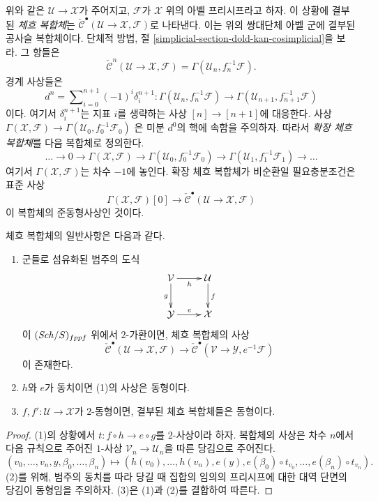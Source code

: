 \medskip\noindent
위와 같은 $\mathcal{U} \to \mathcal{X}$가 주어지고,
$\mathcal{F}$가 $\mathcal{X}$ 위의 아벨 프리시프라고 하자.
이 상황에 결부된 {\it 체흐 복합체}는
$\check{\mathcal{C}}^\bullet(\mathcal{U} \to \mathcal{X}, \mathcal{F})$로
나타낸다. 이는 위의 쌍대단체 아벨 군에 결부된 공사슬
복합체이다. 단체적 방법, 절
\ref{simplicial-section-dold-kan-cosimplicial}을 보라.
그 항들은
$$
\check{\mathcal{C}}^n(\mathcal{U} \to \mathcal{X}, \mathcal{F})
= \Gamma(\mathcal{U}_n, f_n^{-1}\mathcal{F}).
$$
경계 사상들은
$$
d^n = \sum\nolimits_{i = 0}^{n + 1} (-1)^i \delta^{n + 1}_i :
\Gamma(\mathcal{U}_n, f_n^{-1}\mathcal{F})
\longrightarrow
\Gamma(\mathcal{U}_{n + 1}, f_{n + 1}^{-1}\mathcal{F})
$$
이다. 여기서 $\delta^{n + 1}_i$는 지표 $i$를 생략하는 사상
$[n] \to [n + 1]$에 대응한다. 사상
$\Gamma(\mathcal{X}, \mathcal{F}) \to
\Gamma(\mathcal{U}_0, f_0^{-1}\mathcal{F}_0)$
은 미분 $d^0$의 핵에 속함을 주의하자. 따라서
{\it 확장 체흐 복합체}를 다음 복합체로 정의한다.
$$
\ldots \to 0 \to
\Gamma(\mathcal{X}, \mathcal{F}) \to
\Gamma(\mathcal{U}_0, f_0^{-1}\mathcal{F}_0) \to
\Gamma(\mathcal{U}_1, f_1^{-1}\mathcal{F}_1) \to \ldots
$$
여기서 $\Gamma(\mathcal{X}, \mathcal{F})$는 차수 $-1$에 놓인다.
확장 체흐 복합체가 비순환일 필요충분조건은 표준 사상
$$
\Gamma(\mathcal{X}, \mathcal{F})[0]
\longrightarrow
\check{\mathcal{C}}^\bullet(\mathcal{U} \to \mathcal{X}, \mathcal{F})
$$
이 복합체의 준동형사상인 것이다.

\begin{lemma}
\label{lemma-generalities}
체흐 복합체의 일반사항은 다음과 같다.
\begin{enumerate}
\item 군들로 섬유화된 범주의 도식
$$
\xymatrix{
\mathcal{V} \ar[d]_g \ar[r]_h & \mathcal{U} \ar[d]^f \\
\mathcal{Y} \ar[r]^e & \mathcal{X}
}
$$
이 $(\mathit{Sch}/S)_{fppf}$ 위에서 $2$-가환이면, 체흐 복합체의 사상
$$
\check{\mathcal{C}}^\bullet(\mathcal{U} \to \mathcal{X}, \mathcal{F})
\longrightarrow
\check{\mathcal{C}}^\bullet(\mathcal{V} \to \mathcal{Y}, e^{-1}\mathcal{F})
$$
이 존재한다.
\item $h$와 $e$가 동치이면 (1)의 사상은 동형이다.
\item $f, f' : \mathcal{U} \to \mathcal{X}$가 $2$-동형이면,
결부된 체흐 복합체들은 동형이다.
\end{enumerate}
\end{lemma}

\begin{proof}
(1)의 상황에서 $t : f \circ h \to e \circ g$를 $2$-사상이라 하자.
복합체의 사상은 차수 $n$에서 다음 규칙으로 주어진 $1$-사상
$\mathcal{V}_n \to \mathcal{U}_n$을 따른 당김으로 주어진다.
$$
(v_0, \ldots, v_n, y, \beta_0, \ldots, \beta_n)
\longmapsto
(h(v_0), \ldots, h(v_n), e(y),
e(\beta_0) \circ t_{v_0}, \ldots, e(\beta_n) \circ t_{v_n}).
$$
(2)를 위해, 범주의 동치를 따라 당길 때 집합의 임의의 프리시프에
대한 대역 단면의 당김이 동형임을 주의하자.
(3)은 (1)과 (2)를 결합하여 따른다.
\end{proof}

